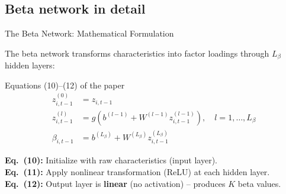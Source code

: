 \documentclass[aspectratio=169]{beamer}
\begin{document}
\subsection{Beta network in detail}
%
\begin{frame}{The Beta Network: Mathematical Formulation}

The beta network transforms characteristics into factor loadings through $L_\beta$ hidden layers:

\begin{block}{Equations (10)--(12) of the paper}
\begin{align}
z^{(0)}_{i,t-1} &= z_{i,t-1} \tag{10}\\[6pt]
z^{(l)}_{i,t-1} &= g\!\left(b^{(l-1)} + W^{(l-1)} z^{(l-1)}_{i,t-1}\right), \quad l = 1, \ldots, L_\beta \tag{11}\\[6pt]
\beta_{i,t-1} &= b^{(L_\beta)} + W^{(L_\beta)} z^{(L_\beta)}_{i,t-1} \tag{12}
\end{align}
\end{block}

\vspace{0.3em}
\textbf{Eq.\ (10):} Initialize with raw characteristics (input layer).\\
\textbf{Eq.\ (11):} Apply nonlinear transformation (ReLU) at each hidden layer.\\
\textbf{Eq.\ (12):} Output layer is \textbf{linear} (no activation) -- produces $K$ beta values.
\end{frame}
%
%
\end{document}
